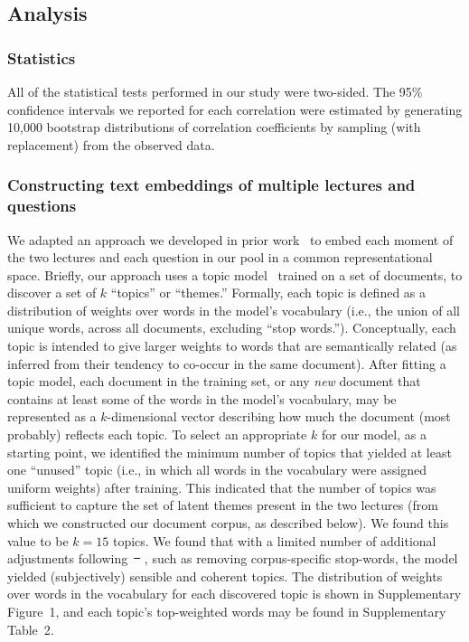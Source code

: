 \documentclass[10pt]{article}
\newcommand{\topics}{2}
\newcommand{\topicWordWeights}{1}
\providecommand{\DIFaddtex}[1]{{\protect\color{blue}\uwave{#1}}} %
\providecommand{\DIFdeltex}[1]{{\protect\color{red}\sout{#1}}}                      %
\providecommand{\DIFaddbegin}{} %
\providecommand{\DIFaddend}{} %
\providecommand{\DIFdelbegin}{} %
\providecommand{\DIFdelend}{} %
\providecommand{\DIFadd}[1]{\texorpdfstring{\DIFaddtex{#1}}{#1}} %
\providecommand{\DIFdel}[1]{\texorpdfstring{\DIFdeltex{#1}}{}} %
\newcommand{\DIFscaledelfig}{0.5}
\newlength{\DIFdelgraphicswidth} %
\newlength{\DIFdelgraphicsheight} %
\newcommand{\DIFaddincludegraphics}[2][]{{\color{blue}\fbox{\DIFOincludegraphics[#1]{#2}}}} %
\newcommand{\DIFdelincludegraphics}[2][]{%
\sbox{\DIFdelgraphicsbox}{\DIFOincludegraphics[#1]{#2}}%
\settoboxwidth{\DIFdelgraphicswidth}{\DIFdelgraphicsbox} %
\settoboxtotalheight{\DIFdelgraphicsheight}{\DIFdelgraphicsbox} %
\scalebox{\DIFscaledelfig}{%
\parbox[b]{\DIFdelgraphicswidth}{\usebox{\DIFdelgraphicsbox}\\[-\baselineskip] \rule{\DIFdelgraphicswidth}{0em}}\llap{\resizebox{\DIFdelgraphicswidth}{\DIFdelgraphicsheight}{%
\setlength{\unitlength}{\DIFdelgraphicswidth}%
\begin{picture}(1,1)%
\thicklines\linethickness{2pt} %
{\color[rgb]{1,0,0}\put(0,0){\framebox(1,1){}}}%
{\color[rgb]{1,0,0}\put(0,0){\line( 1,1){1}}}%
{\color[rgb]{1,0,0}\put(0,1){\line(1,-1){1}}}%
\end{picture}%
}\hspace*{3pt}}} %
} %
\DeclareRobustCommand{\DIFaddbegin}{\DIFOaddbegin \let\includegraphics\DIFaddincludegraphics} %
\DeclareRobustCommand{\DIFaddend}{\DIFOaddend \let\includegraphics\DIFOincludegraphics} %
\DeclareRobustCommand{\DIFdelbegin}{\DIFOdelbegin \let\includegraphics\DIFdelincludegraphics} %
\DeclareRobustCommand{\DIFdelend}{\DIFOaddend \let\includegraphics\DIFOincludegraphics} %
\begin{document}
\subsection*{Analysis}

\subsubsection*{Statistics}

All of the statistical tests performed in our study were two-sided. The 95\%
confidence intervals we reported for each correlation were estimated by
generating 10,000 bootstrap distributions of correlation coefficients by
sampling (with replacement) from the observed data.

\subsubsection*{Constructing text embeddings of multiple lectures and questions}\label{subsec:topic-modeling}

We adapted an approach we developed in prior work~\citep{HeusEtal21} to embed
each moment of the two lectures and each question in our pool in a common
representational space. Briefly, our approach uses a topic model~\citep[Latent
Dirichlet Allocation; ][]{BleiEtal03} trained on a set of documents, to
discover a set of $k$ ``topics'' or ``themes.'' Formally, each topic is
defined as a distribution of weights over words in the model's vocabulary
(i.e., the union of all unique words, across all documents, excluding ``stop
words.''). Conceptually, each topic is intended to give larger weights to words
that are semantically related (as inferred from their tendency to co-occur in
the same document). After fitting a topic model, each document in the training
set, or any \textit{new} document that contains at least some of the words in
the model's vocabulary, may be represented as a $k$-dimensional vector
describing how much the document (most probably) reflects each topic. To select
an appropriate $k$ for our model, as a starting point, we identified the
minimum number of topics that yielded at least one ``unused'' topic (i.e., in
which all words in the vocabulary were assigned uniform weights) after
training. This indicated that the number of topics was sufficient to capture
the set of latent themes present in the two lectures (from which we constructed
our document corpus, as described below). We found this value to be $k = 15$
topics. We found that with a limited number of additional adjustments
following~\DIFdelbegin \DIFdel{\mbox{%
\citep{BoydEtal14}}\hskip0pt%
}\DIFdelend \DIFaddbegin \DIFadd{\mbox{%
\citet{BoydEtal14}}\hskip0pt%
}\DIFaddend , such as removing corpus-specific stop-words, the
model yielded (subjectively) sensible and coherent topics. The distribution of
weights over words in the vocabulary for each discovered topic is shown in
Supplementary Figure~\topicWordWeights, and each topic's top-weighted words may
be found in Supplementary Table~\topics.
\end{document}
